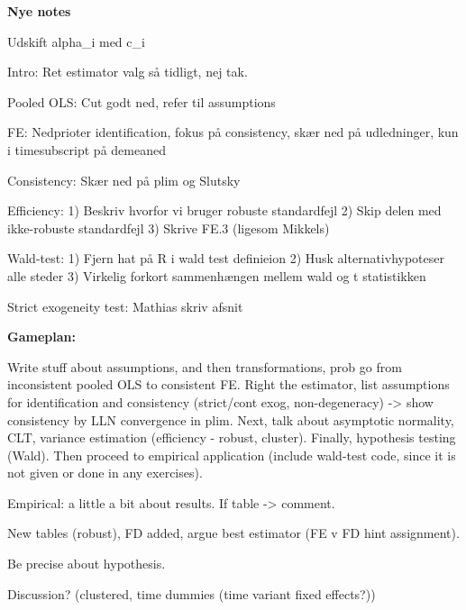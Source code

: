 \textbf{Nye notes}

Udskift alpha_i med c_i

Intro: Ret estimator valg så tidligt, nej tak. 

Pooled OLS: Cut godt ned, refer til assumptions

FE: Nedprioter identification, fokus på consistency, skær ned på udledninger, kun i timesubscript på demeaned

Consistency: Skær ned på plim og Slutsky

Efficiency:
1) Beskriv hvorfor vi bruger robuste standardfejl
2) Skip delen med ikke-robuste standardfejl
3) Skrive FE.3 (ligesom Mikkels)

Wald-test:
1) Fjern hat på R i wald test definieion
2) Husk alternativhypoteser alle steder
3) Virkelig forkort sammenhængen mellem wald og t statistikken

Strict exogeneity test: Mathias skriv afsnit




\textbf{Gameplan:}

Write stuff about assumptions, and then transformations, prob go from inconsistent pooled OLS to consistent FE. Right the estimator, list assumptions for identification and consistency (strict/cont exog, non-degeneracy) -> show consistency by LLN convergence in plim. Next, talk about asymptotic normality, CLT, variance estimation (efficiency - robust, cluster). Finally, hypothesis testing (Wald). Then proceed to empirical application (include wald-test code, since it is not given or done in any exercises).

Empirical: 
a little a bit about results. If table -> comment. 

New tables (robust), FD added, argue best estimator (FE v FD hint assignment). 

Be precise about hypothesis. 

Discussion? (clustered, time dummies (time variant fixed effects?)) 

